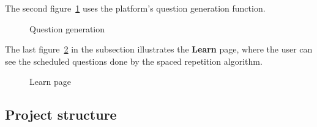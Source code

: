 The second figure~\ref {fig:screenshot-question-generation} uses the platform's question generation function.

\begin{figure}[H]
	\centering
	\caption{Question generation}
	\label{fig:screenshot-question-generation}
\end{figure}

The last figure~\ref{fig:screenshot-learn-page} in the subsection illustrates the \textbf{Learn} page, where the user can see the scheduled questions done by the spaced repetition algorithm.

\begin{figure}[H]
	\centering
	\caption{Learn page}
	\label{fig:screenshot-learn-page}
\end{figure}

\subsection{Project structure}

